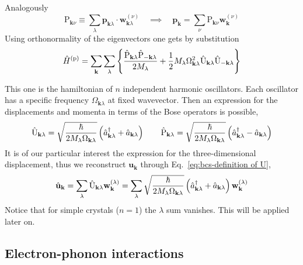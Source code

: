 Analogously
\[
	\mathrm{P}_{\mathbf{k}\nu} \equiv
	\sum_\lambda
	\mathbf{p}_{\mathbf{k}\lambda} \cdot
	\mathbf{w}_{\mathbf{k}\lambda}^{(\nu)}
	\quad\implies\quad
	\mathbf{p}_\mathbf{k} = \sum_\nu \mathrm{P}_{\mathbf{k}\nu} \mathbf{w}_{\mathbf{k}}^{(\nu)}
\]
Using orthonormality of the eigenvectors one gets by substitution
\[
	\hat H^{(\mathrm{p})} = \sum_\mathbf{k} \sum_\lambda \lrB{
		\frac{\hat{\mathrm{P}}_{\mathbf{k}\lambda} \hat{\mathrm{P}}_{-\mathbf{k}\lambda}}{2M_\lambda}
		+ \half M_\lambda \Omega_{\mathbf{k}\lambda}^2 \hat{\mathrm{U}}_{\mathbf{k}\lambda} \hat{\mathrm{U}}_{-\mathbf{k}\lambda}
	}
\]

This one is the hamiltonian of $n$ independent harmonic oscillators. Each oscillator has a specific frequency $\Omega_{\mathbf{k}\lambda}$ at fixed wavevector. Then an expression for the displacements and momenta in terms of the Bose operators is possible,
\[
	\hat{\mathrm{U}}_{\mathbf{k}\lambda} = \sqrt{\frac{\hbar}{2M_\lambda \Omega_{\mathbf{k}\lambda}}} \left({\hat{a}_{\mathbf{k}\lambda}^\dagger + \hat{a}_{\mathbf{k}\lambda}}\right)
	\qquad
	\hat{\mathrm{P}}_{\mathbf{k}\lambda} = \sqrt{\frac{\hbar}{2M_\lambda \Omega_{\mathbf{k}\lambda}}} \left({\hat{a}_{\mathbf{k}\lambda}^\dagger - \hat{a}_{\mathbf{k}\lambda}}\right)
\]
It is of our particular interest the expression for the three-dimensional displacement, thus we reconstruct $\mathbf{u}_\mathbf{k}$ through Eq.~\eqref{eq:bcs-definition of U},
\[
	\hat{\mathbf{u}}_\mathbf{k} = \sum_\lambda \hat{\mathrm{U}}_{\mathbf{k}\lambda} \mathbf{w}_{\mathbf{k}}^{(\lambda)} = \sum_\lambda \sqrt{\frac{\hbar}{2M_\lambda \Omega_{\mathbf{k}\lambda}}} \left({\hat{a}_{\mathbf{k}\lambda}^\dagger + \hat{a}_{\mathbf{k}\lambda}}\right) \mathbf{w}_{\mathbf{k}}^{(\lambda)}
\]
Notice that for simple crystals ($n=1$) the $\lambda$ sum vanishes. This will be applied later on.

\subsection{Electron-phonon interactions}

